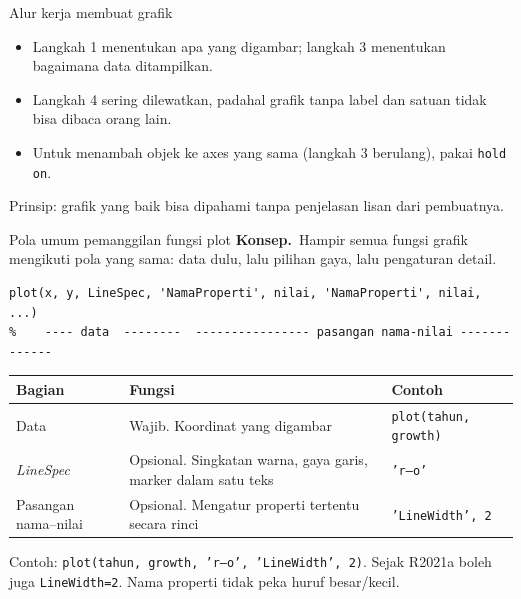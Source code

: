 \documentclass[10pt,aspectratio=169]{beamer}
\newcommand{\konsep}{\alert{\textbf{Konsep.}}\ }
\newcommand{\kd}[1]{\texttt{#1}}
\begin{document}
\begin{frame}{Alur kerja membuat grafik}
\begin{center}
\end{center}
\begin{itemize}
  \item Langkah 1 menentukan \alert{apa} yang digambar; langkah 3 menentukan \alert{bagaimana} data ditampilkan.
  \item Langkah 4 sering dilewatkan, padahal grafik tanpa label dan satuan tidak bisa dibaca orang lain.
  \item Untuk menambah objek ke axes yang sama (langkah 3 berulang), pakai \kd{hold on}.
\end{itemize}
\smallskip
{\small Prinsip: grafik yang baik bisa dipahami \alert{tanpa} penjelasan lisan dari pembuatnya.}
\end{frame}

\begin{frame}[fragile]{Pola umum pemanggilan fungsi plot}
\small
\konsep Hampir semua fungsi grafik mengikuti pola yang sama: data dulu, lalu pilihan gaya, lalu pengaturan detail.
\begin{lstlisting}[basicstyle=\ttfamily\footnotesize]
plot(x, y, LineSpec, 'NamaProperti', nilai, 'NamaProperti', nilai, ...)
%    ---- data  --------  ---------------- pasangan nama-nilai -------------
\end{lstlisting}
\begin{tabular}{p{}p{}l}
\toprule
Bagian & Fungsi & Contoh\\
\midrule
Data & Wajib. Koordinat yang digambar & \kd{plot(tahun, growth)}\\
\emph{LineSpec} & Opsional. Singkatan warna, gaya garis, marker dalam satu teks & \kd{'r--o'}\\
Pasangan nama--nilai & Opsional. Mengatur properti tertentu secara rinci & \kd{'LineWidth', 2}\\
\bottomrule
\end{tabular}

\medskip
Contoh: \kd{plot(tahun, growth, 'r--o', 'LineWidth', 2)}. Sejak R2021a boleh juga \kd{LineWidth=2}. Nama properti tidak peka huruf besar/kecil.
\end{frame}
\end{document}
